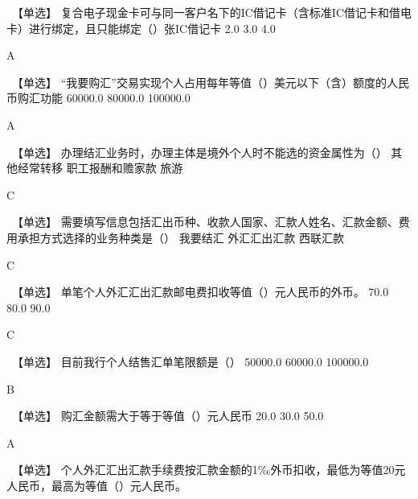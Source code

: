\documentclass[kindlepaper]{BHCexam4kindle}
\begin{document}
\begin{questions}
\qs　【单选】 复合电子现金卡可与同一客户名下的IC借记卡（含标准IC借记卡和借电卡）进行绑定，且只能绑定（）张IC借记卡 \xx
{} {  2.0 } { 3.0 } { 4.0 }
\begin{solution} A \end{solution}
\qs　【单选】 “我要购汇”交易实现个人占用每年等值（）美元以下（含）额度的人民币购汇功能 \xx
{} {  60000.0 } { 80000.0 } { 100000.0 }
\begin{solution} A \end{solution}
\qs　【单选】 办理结汇业务时，办理主体是境外个人时不能选的资金属性为（） \xx
{} {  其他经常转移 } { 职工报酬和赡家款 } { 旅游 }
\begin{solution} C \end{solution}
\qs　【单选】 需要填写信息包括汇出币种、收款人国家、汇款人姓名、汇款金额、费用承担方式选择的业务种类是（） \xx
{} {  我要结汇 } { 外汇汇出汇款 } { 西联汇款 }
\begin{solution} C \end{solution}
\qs　【单选】 单笔个人外汇汇出汇款邮电费扣收等值（）元人民币的外币。 \xx
{} {  70.0 } { 80.0 } { 90.0 }
\begin{solution} C  \end{solution}
\qs　【单选】 目前我行个人结售汇单笔限额是（） \xx
{} {  50000.0 } { 60000.0 } { 100000.0 }
\begin{solution} B  \end{solution}
\qs　【单选】 购汇金额需大于等于等值（）元人民币 \xx
{} {  20.0 } { 30.0 } { 50.0 }
\begin{solution} A \end{solution}
\qs　【单选】 个人外汇汇出汇款手续费按汇款金额的1‰外币扣收，最低为等值20元人民币，最高为等值（）元人民币。 \xx

\end{questions}
\end{document}
